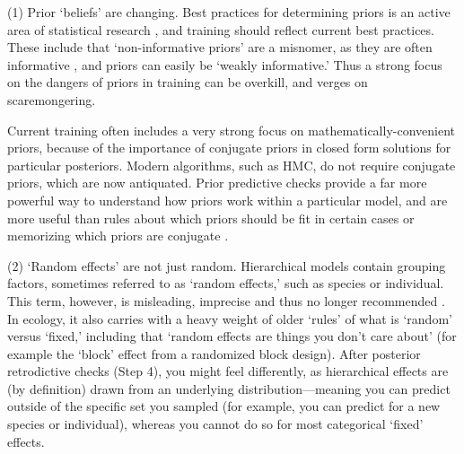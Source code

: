 \documentclass[11pt]{article}
\begin{document}
(1) Prior `beliefs' are changing. Best practices for determining priors is an active area of statistical research \citep{BDA,regotherstories,betanprior}, and training should reflect current best practices. These include that `non-informative priors' are a misnomer, as they are often informative  \citep{lemoine2019}, and priors can easily be `weakly informative.' Thus a strong focus on the dangers of priors in training can be overkill, and verges on scaremongering. %

Current training often includes a very strong focus on mathematically-convenient priors, because of the importance of conjugate priors in closed form solutions for particular posteriors. Modern algorithms, such as HMC, do not require conjugate priors, which are now antiquated.
Prior predictive checks provide a far more powerful way to understand how priors work within a particular model, and are more useful than rules about which priors should be fit in certain cases or memorizing which priors are conjugate \citep{betanprior}. %

(2) `Random effects' are not just random. Hierarchical models contain grouping factors, sometimes referred to as `random effects,' such as species or individual. This term, however, is misleading, imprecise and thus no longer recommended \citep{gelmanhill}. In ecology, it also carries with a heavy weight of older `rules' of what is `random' versus `fixed,' including that `random effects are things you don't care about' (for example the `block' effect from a randomized block design). After posterior retrodictive checks (Step 4), you might feel differently, as hierarchical effects are (by definition) drawn from an underlying distribution---meaning you can predict outside of the specific set you sampled (for example, you can predict for a new species or individual), whereas you cannot do so for most categorical `fixed' effects.
\end{document}
